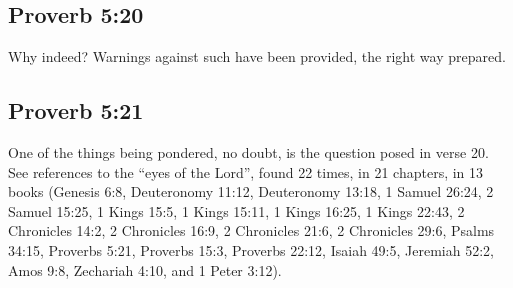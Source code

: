 \subsection{Proverb 5:20}
Why indeed? Warnings against such have been provided, the right way prepared. 

\subsection{Proverb 5:21}
One of the things being pondered, no doubt, is the question posed in verse 20. See references to the ``eyes of the Lord'', found 22 times, in 21 chapters, in 13 books (Genesis 6:8, Deuteronomy 11:12, Deuteronomy 13:18, 1 Samuel 26:24, 2 Samuel 15:25, 1 Kings 15:5, 1 Kings 15:11, 1 Kings 16:25, 1 Kings 22:43, 2 Chronicles 14:2, 2 Chronicles 16:9, 2 Chronicles 21:6, 2 Chronicles 29:6, Psalms 34:15, Proverbs 5:21, Proverbs 15:3, Proverbs 22:12, Isaiah 49:5, Jeremiah 52:2, Amos 9:8, Zechariah 4:10, and 1 Peter 3:12).

\newpage

